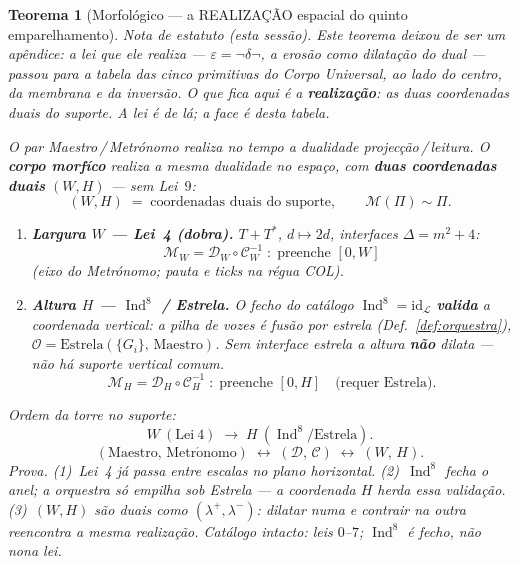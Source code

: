 \documentclass[11pt,a4paper]{article}
\newtheorem{teorema}{Teorema}
\begin{document}
\begin{teorema}[Morfológico --- a REALIZAÇÃO espacial do quinto
emparelhamento]\label{thm:morfologico}
\emph{Nota de estatuto (esta sessão).} Este teorema deixou de ser um
apêndice: a lei que ele realiza --- $\varepsilon=\neg\delta\neg$, a erosão
como dilatação do dual --- passou para a tabela das cinco primitivas do
\emph{Corpo Universal}, ao lado do centro, da membrana e da inversão. O
que fica aqui é a \textbf{realização}: as duas coordenadas duais do
suporte. A lei é de lá; a face é desta tabela.

O par Maestro\,/\,Metrónomo realiza no \emph{tempo} a dualidade
projecção\,/\,leitura. O \textbf{corpo morfíco} realiza a mesma
dualidade no \emph{espaço}, com \textbf{duas coordenadas duais}
$(W,H)$ --- sem Lei~$9$:
\[
\boxed{
(W,H)
\;=\;
\text{coordenadas duais do suporte},
\qquad
\mathcal{M}(\Pi)\sim\Pi.
}
\]
\begin{enumerate}
\item \textbf{Largura $W$ --- Lei~4 (dobra).}
$T+T^{*}$, $d\mapsto 2d$, interfaces $\Delta=m^{2}+4$:
\[
\boxed{
\mathcal{M}_{W}=\mathcal{D}_{W}\circ\mathcal{C}_{W}^{-1}
\;:\;
\text{preenche }[0,W]
}
\]
(eixo do Metrónomo; pauta e ticks na régua COL).
\item \textbf{Altura $H$ --- $\operatorname{Ind}^{8}$ / Estrela.}
O fecho do catálogo $\operatorname{Ind}^{8}=\mathrm{id}_{\mathcal L}$
\textbf{valida} a coordenada vertical: a pilha de vozes é fusão por
estrela (Def.~\ref{def:orquestra}),
$\mathcal{O}=\mathrm{Estrela}(\{G_i\},\,\mathrm{Maestro})$.
Sem interface estrela a altura \textbf{não} dilata --- não há suporte
vertical comum.
\[
\boxed{
\mathcal{M}_{H}=\mathcal{D}_{H}\circ\mathcal{C}_{H}^{-1}
\;:\;
\text{preenche }[0,H]
\quad\text{(requer Estrela)}.
}
\]
\end{enumerate}
Ordem da torre no suporte:
\[
\boxed{
W\ (\mathrm{Lei~4})
\;\longrightarrow\;
H\ (\operatorname{Ind}^{8}/\mathrm{Estrela}).
}
\]
\[
\boxed{
(\mathrm{Maestro},\,\mathrm{Metr\acute{o}nomo})
\;\longleftrightarrow\;
(\mathcal{D},\,\mathcal{C})
\;\longleftrightarrow\;
(W,\,H).
}
\]
\emph{Prova.} (1)~Lei~4 já passa entre escalas no plano horizontal.
(2)~$\operatorname{Ind}^{8}$ fecha o anel; a orquestra só empilha sob
Estrela --- a coordenada $H$ herda essa validação. (3)~$(W,H)$ são
duais como $(\lambda^{+},\lambda^{-})$: dilatar numa e contrair na outra
reencontra a mesma realização. Catálogo intacto: leis $0$--$7$;
$\operatorname{Ind}^{8}$ é fecho, não nona lei.
\end{teorema}
\end{document}
